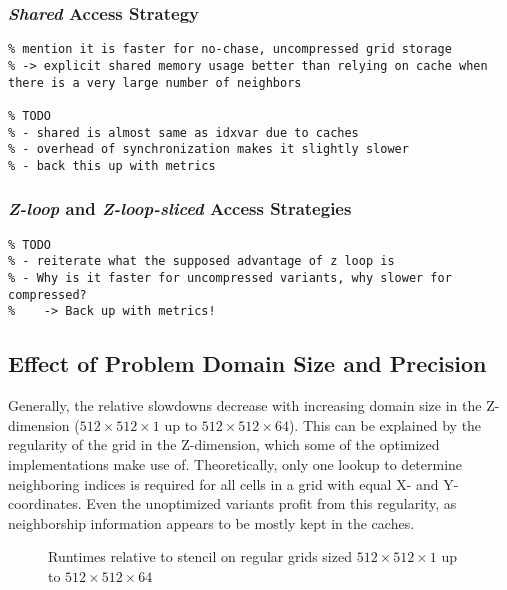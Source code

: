 \subsubsection{\emph{Shared} Access Strategy}

\begin{verbatim}
% mention it is faster for no-chase, uncompressed grid storage
% -> explicit shared memory usage better than relying on cache when there is a very large number of neighbors

% TODO
% - shared is almost same as idxvar due to caches
% - overhead of synchronization makes it slightly slower
% - back this up with metrics
\end{verbatim}

\subsubsection{\emph{Z-loop} and \emph{Z-loop-sliced} Access Strategies}

\begin{verbatim}
% TODO
% - reiterate what the supposed advantage of z loop is
% - Why is it faster for uncompressed variants, why slower for compressed?
%    -> Back up with metrics!
\end{verbatim}

\subsection{Effect of Problem Domain Size and Precision} \label{sec:res-size}

Generally, the relative slowdowns decrease with increasing domain size in the Z-dimension ($512\times 512\times 1$ up to $512\times 512\times 64$). This can be explained by the regularity of the grid in the Z-dimension, which some of the optimized implementations make use of. Theoretically, only one lookup to determine neighboring indices is required for all cells in a grid with equal X- and Y-coordinates. Even the unoptimized variants profit from this regularity, as neighborship information appears to be mostly kept in the caches.

\begin{figure}
	\caption{\label{fig:results-512-sizes}Runtimes relative to stencil on regular grids sized $512\times 512\times 1$ up to $512\times 512\times 64$}
\end{figure}

